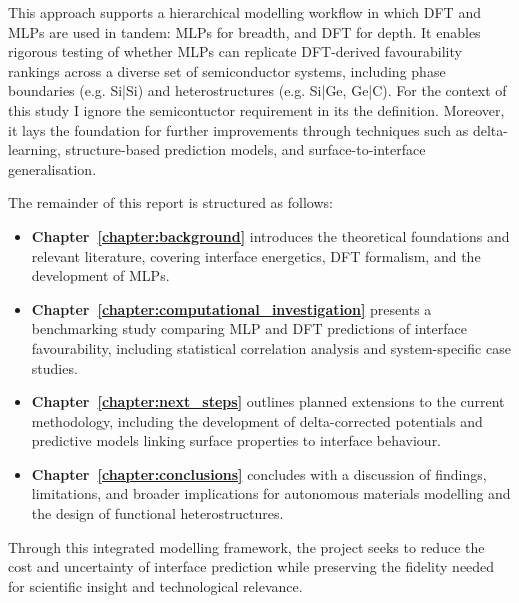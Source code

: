 This approach supports a hierarchical modelling workflow in which DFT and MLPs are used in tandem: MLPs for breadth, and DFT for depth. It enables rigorous testing of whether MLPs can replicate DFT-derived favourability rankings across a diverse set of semiconductor systems, including phase boundaries (e.g. Si|Si) and heterostructures (e.g. Si|Ge, Ge|C). For the context of this study I ignore the semicontuctor requirement in its the definition. Moreover, it lays the foundation for further improvements through techniques such as delta-learning, structure-based prediction models, and surface-to-interface generalisation.

The remainder of this report is structured as follows:

\begin{itemize}
    \item \textbf{Chapter~\ref{chapter:background}} introduces the theoretical foundations and relevant literature, covering interface energetics, DFT formalism, and the development of MLPs.
    \item \textbf{Chapter~\ref{chapter:computational_investigation}} presents a benchmarking study comparing MLP and DFT predictions of interface favourability, including statistical correlation analysis and system-specific case studies.
    \item \textbf{Chapter~\ref{chapter:next_steps}} outlines planned extensions to the current methodology, including the development of delta-corrected potentials and predictive models linking surface properties to interface behaviour.
    \item \textbf{Chapter~\ref{chapter:conclusions}} concludes with a discussion of findings, limitations, and broader implications for autonomous materials modelling and the design of functional heterostructures.
\end{itemize}

Through this integrated modelling framework, the project seeks to reduce the cost and uncertainty of interface prediction while preserving the fidelity needed for scientific insight and technological relevance.